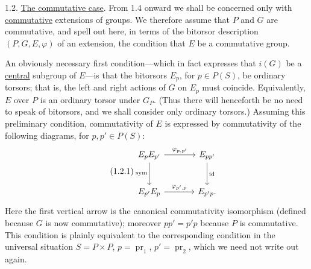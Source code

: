 
1.2. \underline{The commutative case}. From 1.4 onward we shall be
concerned only with \underline{commutative} extensions of groups. We
therefore assume that $P$ and $G$ are commutative, and spell out here,
in terms of the bitorsor description $(P,G,E,\varphi)$ of an extension,
the condition that $E$ be a commutative group.


An obviously necessary first condition---which in fact expresses that
$i(G)$ be a \underline{central} subgroup of $E$---is that the bitorsors
$E_p$, for $p\in P(S)$, be ordinary torsors; that is, the left and right
actions of $G$ on $E_p$ must coincide. Equivalently, $E$ over $P$ is an
ordinary torsor under $G_P$. (Thus there will henceforth be no need to
speak of bitorsors, and we shall consider only ordinary torsors.) Assuming
this preliminary condition, commutativity of $E$ is expressed by
commutativity of the following diagrams, for $p,p'\in P(S)$:
\begin{equation}\tag{1.2.1}
\begin{tikzcd}[column sep=large, row sep=large]
 E_pE_{p'} \arrow[r, "{\varphi_{p,p'}}"] \arrow[d, "\mathrm{sym}"']
   & E_{pp'} \arrow[d, "\id"] \\
 E_{p'}E_p \arrow[r, "{\varphi_{p',p}}"]
   & E_{p'p}.
\end{tikzcd}
\end{equation}
Here the first vertical arrow is the canonical commutativity isomorphism
(defined because $G$ is now commutative); moreover $pp'=p'p$ because
$P$ is commutative. This condition is plainly equivalent to the
corresponding condition in the universal situation
$S=P\times P$, $p=\operatorname{pr}_1$,
$p'=\operatorname{pr}_2$, which we need not write out again.

